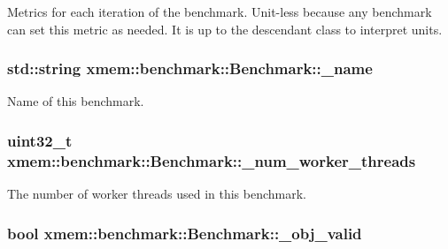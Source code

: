 Metrics for each iteration of the benchmark. Unit-\/less because any benchmark can set this metric as needed. It is up to the descendant class to interpret units. \hypertarget{classxmem_1_1benchmark_1_1_benchmark_ab9653ef73e0f1ca01e08286bdb35e4a6}{
\subsubsection[{\-\_\-name}]{\setlength{\rightskip}{0pt plus 5cm}std\-::string xmem\-::benchmark\-::\-Benchmark\-::\-\_\-name\hspace{0.3cm}{\ttfamily [protected]}}}\label{classxmem_1_1benchmark_1_1_benchmark_ab9653ef73e0f1ca01e08286bdb35e4a6}
Name of this benchmark. \hypertarget{classxmem_1_1benchmark_1_1_benchmark_acb55cafc77a1b53ea9910d1be4306970}{
\subsubsection[{\-\_\-num\-\_\-worker\-\_\-threads}]{\setlength{\rightskip}{0pt plus 5cm}uint32\-\_\-t xmem\-::benchmark\-::\-Benchmark\-::\-\_\-num\-\_\-worker\-\_\-threads\hspace{0.3cm}{\ttfamily [protected]}}}\label{classxmem_1_1benchmark_1_1_benchmark_acb55cafc77a1b53ea9910d1be4306970}
The number of worker threads used in this benchmark. \hypertarget{classxmem_1_1benchmark_1_1_benchmark_a87e133558776380738354191ec5e6560}{
\subsubsection[{\-\_\-obj\-\_\-valid}]{\setlength{\rightskip}{0pt plus 5cm}bool xmem\-::benchmark\-::\-Benchmark\-::\-\_\-obj\-\_\-valid\hspace{0.3cm}{\ttfamily [protected]}}}\label{classxmem_1_1benchmark_1_1_benchmark_a87e133558776380738354191ec5e6560}
